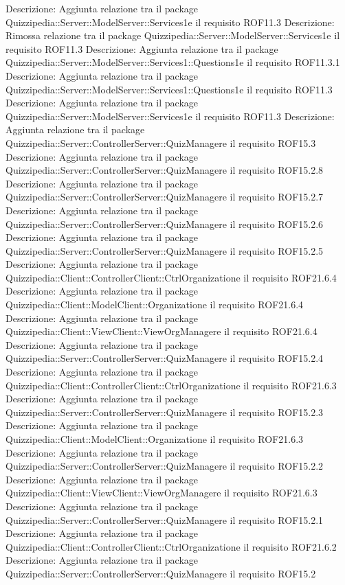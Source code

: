 Descrizione: Aggiunta relazione tra il package Quizzipedia::Server::ModelServer::Services1e il requisito ROF11.3 
Descrizione: Rimossa relazione tra il package Quizzipedia::Server::ModelServer::Services1e il requisito ROF11.3 
Descrizione: Aggiunta relazione tra il package Quizzipedia::Server::ModelServer::Services1::Questions1e il requisito ROF11.3.1 
Descrizione: Aggiunta relazione tra il package Quizzipedia::Server::ModelServer::Services1::Questions1e il requisito ROF11.3 
Descrizione: Aggiunta relazione tra il package Quizzipedia::Server::ModelServer::Services1e il requisito ROF11.3 
Descrizione: Aggiunta relazione tra il package Quizzipedia::Server::ControllerServer::QuizManagere il requisito ROF15.3 
Descrizione: Aggiunta relazione tra il package Quizzipedia::Server::ControllerServer::QuizManagere il requisito ROF15.2.8 
Descrizione: Aggiunta relazione tra il package Quizzipedia::Server::ControllerServer::QuizManagere il requisito ROF15.2.7 
Descrizione: Aggiunta relazione tra il package Quizzipedia::Server::ControllerServer::QuizManagere il requisito ROF15.2.6 
Descrizione: Aggiunta relazione tra il package Quizzipedia::Server::ControllerServer::QuizManagere il requisito ROF15.2.5 
Descrizione: Aggiunta relazione tra il package Quizzipedia::Client::ControllerClient::CtrlOrganizatione il requisito ROF21.6.4 
Descrizione: Aggiunta relazione tra il package Quizzipedia::Client::ModelClient::Organizatione il requisito ROF21.6.4 
Descrizione: Aggiunta relazione tra il package Quizzipedia::Client::ViewClient::ViewOrgManagere il requisito ROF21.6.4 
Descrizione: Aggiunta relazione tra il package Quizzipedia::Server::ControllerServer::QuizManagere il requisito ROF15.2.4 
Descrizione: Aggiunta relazione tra il package Quizzipedia::Client::ControllerClient::CtrlOrganizatione il requisito ROF21.6.3 
Descrizione: Aggiunta relazione tra il package Quizzipedia::Server::ControllerServer::QuizManagere il requisito ROF15.2.3 
Descrizione: Aggiunta relazione tra il package Quizzipedia::Client::ModelClient::Organizatione il requisito ROF21.6.3 
Descrizione: Aggiunta relazione tra il package Quizzipedia::Server::ControllerServer::QuizManagere il requisito ROF15.2.2 
Descrizione: Aggiunta relazione tra il package Quizzipedia::Client::ViewClient::ViewOrgManagere il requisito ROF21.6.3 
Descrizione: Aggiunta relazione tra il package Quizzipedia::Server::ControllerServer::QuizManagere il requisito ROF15.2.1 
Descrizione: Aggiunta relazione tra il package Quizzipedia::Client::ControllerClient::CtrlOrganizatione il requisito ROF21.6.2 
Descrizione: Aggiunta relazione tra il package Quizzipedia::Server::ControllerServer::QuizManagere il requisito ROF15.2 
